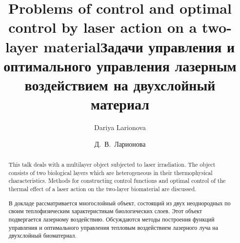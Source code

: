\begin{englishtitle}
\title{Problems of control and optimal control by laser action on a two-layer material}
\author{Dariya Larionova}

\maketitle

\begin{abstract}
This talk deals with a multilayer object subjected to laser irradiation. The object  consists of two biological layers which are heterogeneous in their thermophysical characteristics. Methods for constructing control functions and optimal control of the thermal effect of a laser action on the two-layer biomaterial are discussed.

\end{abstract}
\end{englishtitle}

\iffalse
\documentclass[12pt]{llncs}
\usepackage[T2A]{fontenc}
\usepackage[utf8]{inputenc}
\usepackage[english,russian]{babel}
\usepackage[russian]{nla}




\fi

\title{Задачи управления и оптимального управления лазерным воздействием на двухслойный материал%
}
\author{Д.~В.~Ларионова%
} 


\maketitle

\begin{abstract}
В докладе рассматривается многослойный объект, состоящий из
двух неоднородных по своим теплофизическим характеристикам
биологических слоев. Этот объект подвергается лазерному воздействию. Обсуждаются методы построения 
функций управления и оптимального управления тепловым воздействием
лазерного луча на двухслойный биоматериал. 

\end{abstract}

